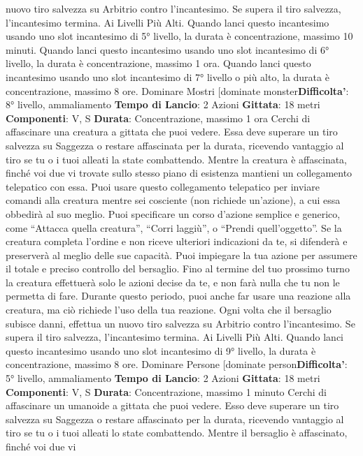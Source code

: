 \begin{multicols}{2}
nuovo tiro salvezza su Arbitrio contro l’incantesimo.
Se supera il tiro salvezza, l’incantesimo termina.
Ai Livelli Più Alti. Quando lanci questo incantesimo
usando uno slot incantesimo di 5° livello, la durata è
concentrazione, massimo 10 minuti. Quando lanci
questo incantesimo usando uno slot incantesimo di 6°
livello, la durata è concentrazione, massimo 1 ora.
Quando lanci questo incantesimo usando uno slot
incantesimo di 7° livello o più alto, la durata è
concentrazione, massimo 8 ore.
Dominare Mostri
[dominate monster\textbf{Difficolta'}:
8° livello, ammaliamento
\textbf{Tempo di Lancio}: 2 Azioni
\textbf{Gittata}: 18 metri
\textbf{Componenti}: V, S
\textbf{Durata}: Concentrazione, massimo 1 ora
Cerchi di affascinare una creatura a gittata che puoi
vedere. Essa deve superare un tiro salvezza su
Saggezza o restare affascinata per la durata, ricevendo
vantaggio al tiro se tu o i tuoi alleati la state
combattendo.
Mentre la creatura è affascinata, finché voi due vi
trovate sullo stesso piano di esistenza mantieni un
collegamento telepatico con essa. Puoi usare questo
collegamento telepatico per inviare comandi alla
creatura mentre sei cosciente (non richiede un’azione),
a cui essa obbedirà al suo meglio. Puoi specificare un
corso d’azione semplice e generico, come “Attacca
quella creatura”, “Corri laggiù”, o “Prendi quell’oggetto”.
Se la creatura completa l’ordine e non riceve ulteriori
indicazioni da te, si difenderà e preserverà al meglio
delle sue capacità.
Puoi impiegare la tua azione per assumere il totale e
preciso controllo del bersaglio. Fino al termine del tuo
prossimo turno la creatura effettuerà solo le azioni
decise da te, e non farà nulla che tu non le permetta di
fare. Durante questo periodo, puoi anche far usare una
reazione alla creatura, ma ciò richiede l’uso della tua
reazione.
Ogni volta che il bersaglio subisce danni, effettua un
nuovo tiro salvezza su Arbitrio contro l’incantesimo.
Se supera il tiro salvezza, l’incantesimo termina.
Ai Livelli Più Alti. Quando lanci questo incantesimo
usando uno slot incantesimo di 9° livello, la durata è
concentrazione, massimo 8 ore.
Dominare Persone
[dominate person\textbf{Difficolta'}:
5° livello, ammaliamento
\textbf{Tempo di Lancio}: 2 Azioni
\textbf{Gittata}: 18 metri
\textbf{Componenti}: V, S
\textbf{Durata}: Concentrazione, massimo 1 minuto
Cerchi di affascinare un umanoide a gittata che puoi
vedere. Esso deve superare un tiro salvezza su
Saggezza o restare affascinato per la durata, ricevendo
vantaggio al tiro se tu o i tuoi alleati lo state
combattendo.
Mentre il bersaglio è affascinato, finché voi due vi

\end{multicols}
